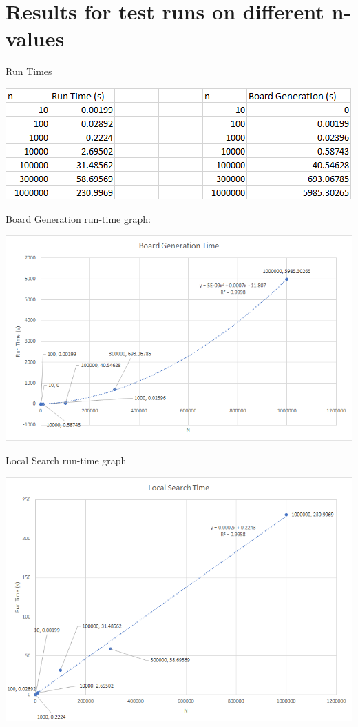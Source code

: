 \documentclass{article}
\begin{document}
\section{Results for test runs on different n-values}
Run Times 
\begin{center}
  \includegraphics[scale=0.6]{RunTimesChart}
\end{center}
Board Generation run-time graph:
\begin{center}
  \includegraphics[scale=0.6]{boardGenerationTimePlot}
\end{center}
\newpage
Local Search run-time graph 
\begin{center}
  \includegraphics[scale=0.6]{localSearchTimePlot}
\end{center}
\end{document}
